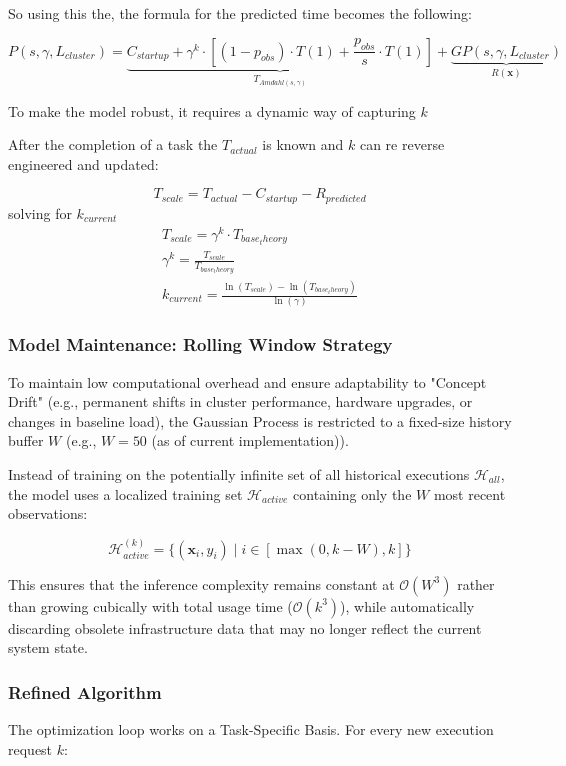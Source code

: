 \documentclass[a4paper, 12pt]{article}
\begin{document}
	So using this the, the formula for the predicted time  becomes the following:
	
	\[
	P(s, \gamma, L_{cluster}) = \underbrace{C_{startup} + \gamma^k \cdot \left[ (1 - p_{obs}) \cdot T(1) + \frac{p_{obs}}{s} \cdot T(1) \right]}_{T_{Amdahl(s, \gamma)}} + \underbrace{GP(s, \gamma, L_{cluster})}_{R(\mathbf{x})}
	\]
	
	To make the model robust, it requires a dynamic way of capturing $k$
	
	After the completion of a task the $T_{actual}$ is known and $k$ can re reverse engineered and updated:
	
	\[
	T_{scale} = T_{actual} - C_{startup} - R_{predicted}
	\]
	solving for $k_{current}$
	\begin{align*}
		T_{scale} = \gamma^k \cdot T_{base_theory} \\[7pt]
		\gamma^k = \frac{T_{scale}}{T_{base_theory}} \\[7pt]
		k_{current} = \frac{\ln(T_{scale}) - \ln(T_{base_theory})}{\ln(\gamma)}
	\end{align*}
	
	\subsubsection*{Model Maintenance: Rolling Window Strategy}
	To maintain low computational overhead and ensure adaptability to "Concept Drift" (e.g., permanent shifts in cluster performance, hardware upgrades, or changes in baseline load), the Gaussian Process is restricted to a fixed-size history buffer $W$ (e.g., $W=50$ (as of current implementation)). 
	
	Instead of training on the potentially infinite set of all historical executions $\mathcal{H}_{all}$, the model uses a localized training set $\mathcal{H}_{active}$ containing only the $W$ most recent observations:
	
	\begin{equation}
		\mathcal{H}_{active}^{(k)} = \{ (\mathbf{x}_i, y_i) \mid i \in [\max(0, k-W), k] \}
	\end{equation}
	
	This ensures that the inference complexity remains constant at $\mathcal{O}(W^3)$ rather than growing cubically with total usage time ($\mathcal{O}(k^3)$), while automatically discarding obsolete infrastructure data that may no longer reflect the current system state.
	
	\subsubsection*{Refined Algorithm}
	The optimization loop works on a Task-Specific Basis. For every new execution request $k$:
	
\end{document}
